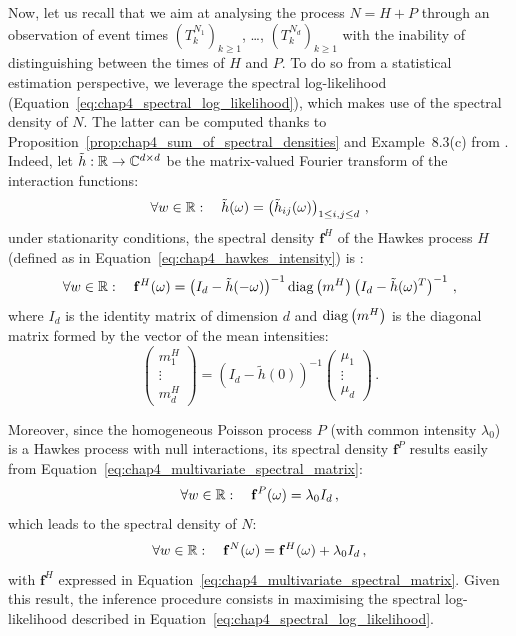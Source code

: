 	      Now, let us recall that we aim at analysing the process $N = H + P$ through an observation of event times $(T_k^{N_1})_{k\geq1}$, \dots, $(T_k^{N_d})_{k\geq1}$ with the inability of distinguishing between the times of $H$ and $P$.
	      To do so from a statistical estimation perspective, we leverage the spectral log-likelihood (Equation~\eqref{eq:chap4_spectral_log_likelihood}), which makes use of the spectral density of $N$.
	      The latter can be computed thanks to Proposition~\ref{prop:chap4_sum_of_spectral_densities} and Example~8.3(c) from \textcite{DaleyV1}.
	      Indeed, let $\tilde h : {\mathbb R} \to \mathbb C^{d \times d}$ be the matrix-valued Fourier transform of the interaction functions:
	      \[
	        \forall w \in {\mathbb R}: \quad
	        \tilde h(\omega) = \left( \tilde h_{ij}(\omega) \right)_{1 \le i, j \le d} \,,
	      \]
	      under stationarity conditions, 
	      the spectral density $\mathbf{f}^H$ of the Hawkes process $H$ (defined as in Equation~\eqref{eq:chap4_hawkes_intensity}) is \parencite[Equation (8.3.11)]{DaleyV1}:
	      \begin{equation}\label{eq:chap4_multivariate_spectral_matrix}
	        \forall w \in {\mathbb R}: \quad
          \mathbf{f}^H(\omega) = \left( I_d - \tilde h(-\omega) \right)^{-1} \operatorname{diag} \left(m^H \right) \left(I_d - \tilde h(\omega)^T \right)^{-1}\,,
        \end{equation}
        where $I_d$ is the identity matrix of dimension $d$ and $\operatorname{diag} \left(m^H \right)$ is the diagonal matrix formed by the vector of the mean intensities:
        \[
          \begin{pmatrix}
            m_1^H\\
            \vdots\\
            m_d^H
          \end{pmatrix}
          = \left( I_d - \tilde h(0) \right)^{-1} 
          \begin{pmatrix}
            \mu_1\\
            \vdots\\
            \mu_d
          \end{pmatrix}\,.
        \]
        
        Moreover, since the homogeneous Poisson process $P$ (with common intensity \(\lambda_0\)) is a Hawkes process with null interactions,
        its spectral density \(\mathbf f^P\) results easily from Equation~\eqref{eq:chap4_multivariate_spectral_matrix}:
        \[
          \forall w \in {\mathbb R}: \quad
          \mathbf{f}^P(\omega) = \lambda_0 I_d \,,
        \]
        which leads to the spectral density of $N$:        
        \begin{equation}\label{eq:chap4_noisy_spectral_matrix}
          \forall w \in {\mathbb R}: \quad
          \mathbf{f}^N(\omega)
          = \mathbf{f}^H(\omega) + \lambda_0 I_d \, ,
        \end{equation}
        with $\mathbf{f}^H$ expressed in Equation~\eqref{eq:chap4_multivariate_spectral_matrix}.
        Given this result, the inference procedure consists in maximising the spectral log-likelihood described in Equation~\eqref{eq:chap4_spectral_log_likelihood}.
        
